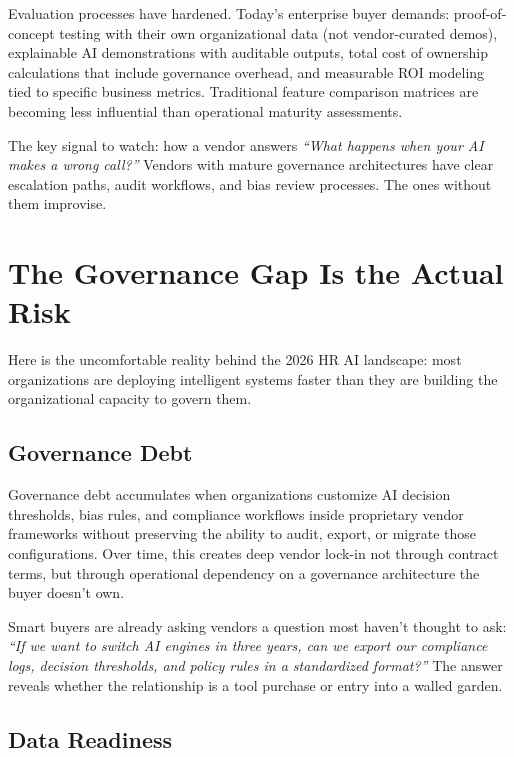 \documentclass[12pt, a4paper]{article}
\begin{document}
Evaluation processes have hardened. Today's enterprise buyer demands: proof-of-concept
testing with their own organizational data (not vendor-curated demos), explainable AI
demonstrations with auditable outputs, total cost of ownership calculations that include
governance overhead, and measurable ROI modeling tied to specific business metrics.
Traditional feature comparison matrices are becoming less influential than operational
maturity assessments.

The key signal to watch: how a vendor answers \emph{``What happens when your AI makes
a wrong call?''} Vendors with mature governance architectures have clear escalation paths,
audit workflows, and bias review processes. The ones without them improvise.

\section{The Governance Gap Is the Actual Risk}

Here is the uncomfortable reality behind the 2026 HR AI landscape: most organizations
are deploying intelligent systems faster than they are building the organizational
capacity to govern them.

\subsection*{Governance Debt}

Governance debt accumulates when organizations customize AI decision thresholds, bias
rules, and compliance workflows inside proprietary vendor frameworks without preserving
the ability to audit, export, or migrate those configurations. Over time, this creates
deep vendor lock-in not through contract terms, but through operational dependency on
a governance architecture the buyer doesn't own.

Smart buyers are already asking vendors a question most haven't thought to ask:
\emph{``If we want to switch AI engines in three years, can we export our compliance
logs, decision thresholds, and policy rules in a standardized format?''} The answer
reveals whether the relationship is a tool purchase or entry into a walled garden.

\subsection*{Data Readiness}
\end{document}
